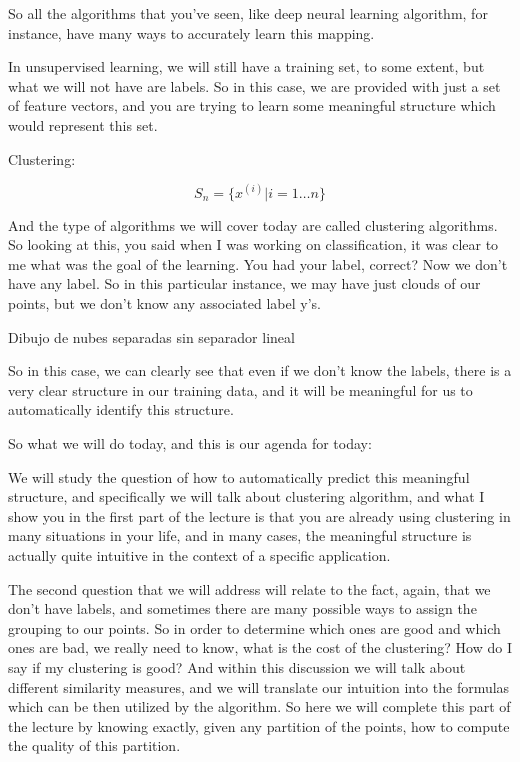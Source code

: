 \documentclass[a4paper, 12pt]{article}
\begin{document}
So all the algorithms that you've seen, like deep neural learning algorithm, for
instance, have many ways to accurately learn this mapping.

In unsupervised learning, we will still have a training set, to some extent, but
what we will not have are labels. So in this case, we are provided with just a
set of feature vectors, and you are trying to learn some meaningful structure
which would represent this set.

Clustering:

\begin{equation}
S_n=\{x^{(i)}|i=1 \ldots n\}
\end{equation}

And the type of algorithms we will cover today are called clustering algorithms.
So looking at this, you said when I was working on classification, it was clear
to me what was the goal of the learning. You had your label, correct? Now we
don't have any label. So in this particular instance, we may have just clouds of
our points, but we don't know any associated label y's.

Dibujo de nubes separadas sin separador lineal

So in this case, we can clearly see that even if we don't know the labels, there
is a very clear structure in our training data, and it will be meaningful for us
to automatically identify this structure.

So what we will do today, and this is our agenda for today:

We will study the question of how to automatically predict this meaningful
structure, and specifically we will talk about clustering algorithm, and what I
show you in the first part of the lecture is that you are already using
clustering in many situations in your life, and in many cases, the meaningful
structure is actually quite intuitive in the context of a specific application.

The second question  that we will address will relate to the fact, again, that
we don't have labels, and sometimes there are many possible ways to assign the
grouping to our points. So in order to determine which ones are good and which
ones are bad, we really need to know, what is the cost of the clustering? How do
I say if my clustering is good? And within this discussion we will talk about
different similarity measures, and we will translate our intuition into the
formulas which can be then utilized by the algorithm. So here we will complete
this part of the lecture by knowing exactly, given any partition of the points,
how to compute the quality of this partition.
\end{document}
